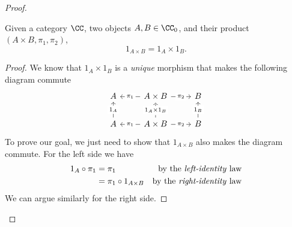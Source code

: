 \begin{solution}
\begin{proof}
			\begin{lemma}
				\label{lem:id-id}
				Given a category $\CC$, two objects $A, B \in \CC_0$, and their product $(A \times B, \pi_1, \pi_2)$,
        \[
					1_{A \times B} = 1_A \times 1_B.
				\]
			\end{lemma}
			\begin{proof}
				We know that $1_A \times 1_B$ is a \textit{unique} morphism that makes the following diagram commute
				\[
					\begin{tikzcd}
						A & {A \times B} & B \\
						A & {A \times B} & B
						\arrow["{\pi_1}"{description}, from=1-2, to=1-1]
						\arrow["{\pi_2}"{description}, from=1-2, to=1-3]
						\arrow["{1_A \times 1_B}"{description}, dashed, from=2-2, to=1-2]
						\arrow["{1_B}"{description}, from=2-3, to=1-3]
						\arrow["{1_A}"{description}, from=2-1, to=1-1]
						\arrow["{\pi_1}"{description}, from=2-2, to=2-1]
						\arrow["{\pi_2}"{description}, from=2-2, to=2-3]
					\end{tikzcd}
				\]
				To prove our goal, we just need to show that $1_{A \times B}$ also makes the diagram commute.
				For the left side we have
				\begin{align*}
					1_A \circ \pi_1 & = \pi_1                      & \text{by the \textit{left-identity} law}  \\
					                & = \pi_1 \circ 1_{A \times B} & \text{by the \textit{right-identity} law}
				\end{align*}
				We can argue similarly for the right side.
			\end{proof}


\end{proof}
\end{solution}
